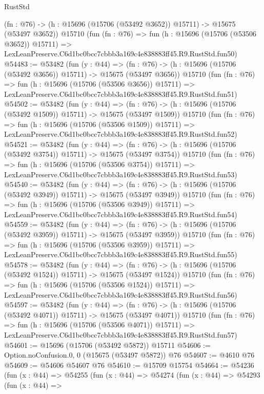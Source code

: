 \begin{lexlean}{RustStd}
\begin{coremodule}
    (fn : @76) -> (h : @15696 (@15706 (@53492 @3652)) @15711) -> @15675 (@53497 @3652))
    @15710
    (fun (fn : @76) =>
    fun (h : @15696 (@15706 (@53506 @3652)) @15711) =>
    LexLeanPreserve.C6d1bc0bcc7cbbb3a169c4e838883ff45.R9.RustStd.fun50)
@54483 := @53482
    (fun (y : @44) =>
    (fn : @76) -> (h : @15696 (@15706 (@53492 @3656)) @15711) -> @15675 (@53497 @3656))
    @15710
    (fun (fn : @76) =>
    fun (h : @15696 (@15706 (@53506 @3656)) @15711) =>
    LexLeanPreserve.C6d1bc0bcc7cbbb3a169c4e838883ff45.R9.RustStd.fun51)
@54502 := @53482
    (fun (y : @44) =>
    (fn : @76) -> (h : @15696 (@15706 (@53492 @1509)) @15711) -> @15675 (@53497 @1509))
    @15710
    (fun (fn : @76) =>
    fun (h : @15696 (@15706 (@53506 @1509)) @15711) =>
    LexLeanPreserve.C6d1bc0bcc7cbbb3a169c4e838883ff45.R9.RustStd.fun52)
@54521 := @53482
    (fun (y : @44) =>
    (fn : @76) -> (h : @15696 (@15706 (@53492 @3754)) @15711) -> @15675 (@53497 @3754))
    @15710
    (fun (fn : @76) =>
    fun (h : @15696 (@15706 (@53506 @3754)) @15711) =>
    LexLeanPreserve.C6d1bc0bcc7cbbb3a169c4e838883ff45.R9.RustStd.fun53)
@54540 := @53482
    (fun (y : @44) =>
    (fn : @76) -> (h : @15696 (@15706 (@53492 @3949)) @15711) -> @15675 (@53497 @3949))
    @15710
    (fun (fn : @76) =>
    fun (h : @15696 (@15706 (@53506 @3949)) @15711) =>
    LexLeanPreserve.C6d1bc0bcc7cbbb3a169c4e838883ff45.R9.RustStd.fun54)
@54559 := @53482
    (fun (y : @44) =>
    (fn : @76) -> (h : @15696 (@15706 (@53492 @3959)) @15711) -> @15675 (@53497 @3959))
    @15710
    (fun (fn : @76) =>
    fun (h : @15696 (@15706 (@53506 @3959)) @15711) =>
    LexLeanPreserve.C6d1bc0bcc7cbbb3a169c4e838883ff45.R9.RustStd.fun55)
@54578 := @53482
    (fun (y : @44) =>
    (fn : @76) -> (h : @15696 (@15706 (@53492 @1524)) @15711) -> @15675 (@53497 @1524))
    @15710
    (fun (fn : @76) =>
    fun (h : @15696 (@15706 (@53506 @1524)) @15711) =>
    LexLeanPreserve.C6d1bc0bcc7cbbb3a169c4e838883ff45.R9.RustStd.fun56)
@54597 := @53482
    (fun (y : @44) =>
    (fn : @76) -> (h : @15696 (@15706 (@53492 @4071)) @15711) -> @15675 (@53497 @4071))
    @15710
    (fun (fn : @76) =>
    fun (h : @15696 (@15706 (@53506 @4071)) @15711) =>
    LexLeanPreserve.C6d1bc0bcc7cbbb3a169c4e838883ff45.R9.RustStd.fun57)
@54601 := @15696 (@15706 (@53492 @5872)) @15711
@54606 := Option.noConfusion.{0, 0} (@15675 (@53497 @5872)) @76
@54607 := @4610 @76
@54609 := @54606 @54607 @76
@54610 := @15709 @15754
@54664 := @54236
    (fun (x : @44) =>
    @54255
      (fun (x : @44) =>
      @54274
        (fun (x : @44) =>
        @54293
          (fun (x : @44) =>

\end{coremodule}
\end{lexlean}
